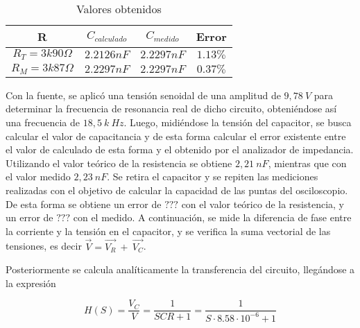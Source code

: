 \documentclass[a4paper]{article}
\begin{document}
 
 \begin{center}
     \begin{table}[H]
     \centering

     \label{table:valores_calculados}
         \begin{tabular}{|c|c|c|c|}
            \hline 
              R &  $C_{calculado}$ &    $C_{medido}$   &  Error\\
            \hline 
            $R_T = 3k90\Omega$  & $2.2126nF$ & $2.2297nF$ & $1.13\%$ \\ \hline  
            $R_M = 3k87\Omega$ & $2.2297nF$ & $2.2297nF$ & $0.37 \%$ \\   \hline
        \end{tabular}
        \caption{Valores obtenidos}
    \end{table}
\end{center}

Con la fuente, se aplicó una tensión senoidal de una amplitud de $9,78 \ V$ para determinar la frecuencia de resonancia real de dicho circuito, obteniéndose así una frecuencia de $18,5 \ k\ Hz$. Luego, midiéndose la tensión del capacitor, se busca calcular el valor de capacitancia y de esta forma calcular el error existente entre el valor de calculado de esta forma y el obtenido por el analizador de impedancia. Utilizando el valor teórico de la resistencia se obtiene $2,21 \ nF $, mientras que con el valor medido $2,23  \ nF  $. Se retira el capacitor y se repiten las mediciones realizadas con el objetivo de calcular la capacidad de las puntas del osciloscopio. De esta forma se obtiene un error de $ ???  $ con el valor teórico de la resistencia, y un error de $  ???  $ con el medido.
A continuación, se mide la diferencia de fase entre la corriente y la tensión en el capacitor, y se verifica la suma vectorial de las tensiones, es decir $ \overrightarrow{V} = \overrightarrow{V_R} \ + \ \overrightarrow{V_C} $.



Posteriormente se calcula analíticamente la transferencia del circuito, llegándose a la expresión

\begin{equation}
	H \left(S \right) = \frac{V_C}{V} = \frac{1}{SCR + 1} = \frac{1}{S \cdot 8.58 \cdot 10^{-6} + 1}
	\label{equ:transfpasabajos}
\end{equation}
\end{document}
